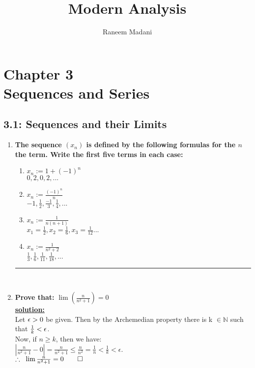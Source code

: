 \documentclass[fleqn,a4paper,12pt,towside]{amsbook}
\title{{\huge Modern Analysis}}
\author{{\Large Raneem Madani}}
\begin{document}
\maketitle
\tableofcontents
\chapter*{{\LARGE Chapter 3\\ Sequences and Series}}
\section*{{\large 3.1: Sequences and their Limits}}
\vspace{1cm}
\begin{enumerate}

\item\textbf{The sequence $(x_n)$ is defined by the following formulas for the $n$ the term. Write the first five terms in each case:}\\
\begin{enumerate}
\item $x_n:=1+(-1)^n$\\$0,2,0,2,...$\\
\item$x_n:=\frac{(-1)^n}{n}$\\$-1,\frac{1}{2},\frac{-1}{3},\frac{1}{4},...$\\
\item$x_n:=\frac{1}{n(n+1)}$\\$x_1=\frac{1}{2},x_2=\frac{1}{6},x_3=\frac{1}{12}...$\\
\item $x_n:=\frac{1}{n^2+2}$\\$\frac{1}{3},\frac{1}{6},\frac{1}{11},\frac{1}{18},...$\\
\end{enumerate}
\noindent\rule{17cm}{1pt}\\


\item [\boxed{\frac{5}{62}}]\textbf{Prove that:}
$\lim\left (\frac{n}{n^2+1}\right)=0$\\
\textbf{\underline{solution:}}\\
Let ${\large \epsilon} > 0$ be given. Then by the Archemedian property there is k $\in \mathbb{N}$ such that $\frac{1}{k} < {\large \epsilon}$.\\
Now, if $n\geq k$, then we have:\\
$\left | \frac{n}{n^2+1}-0\right |=\frac{n}{n^2+1} \leq \frac{n}{n^2}= \frac{1}{n}<\frac{1}{k}<\epsilon$.\\
$\therefore\hspace{.2cm}\lim\frac{n}{n^2+1}=0\qed$
\end{enumerate}
\end{document}
